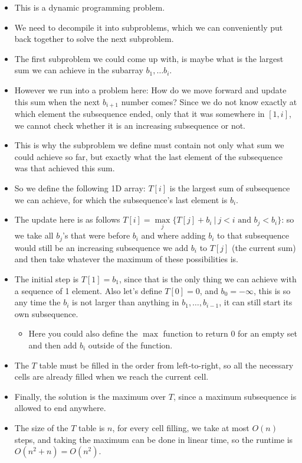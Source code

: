 \begin{itemize}
    \item This is a dynamic programming problem.
    \item We need to decompile it into subproblems, which we can conveniently put back together to solve the next subproblem.
    \item The first subproblem we could come up with, is maybe what is the largest sum we can achieve in the subarray $b_1, \dots{} b_i$.
    \item However we run into a problem here: How do we move forward and update this sum when the next $b_{i+1}$ number comes? Since we do not know exactly at which element the subsequence ended, only that it was somewhere in $[1,i]$, we cannot check whether it is an increasing subsequence or not.
    \item This is why the subproblem we define must contain not only what sum we could achieve so far, but exactly what the last element of the subsequence was that achieved this sum.
    \item So we define the following 1D array: $T[i]$ is the largest sum of subsequence we can achieve, for which the subsequence's last element is $b_i$.
    \item The update here is as follows $T[i] = \max\limits_{j}\{T[j]+b_i ~|~ j < i \text{ and } b_j < b_i \}$: so we take all $b_j$'s that were before $b_i$ and where adding $b_i$ to that subsequence would still be an increasing subsequence we add $b_i$ to $T[j]$ (the current sum) and then take whatever the maximum of these possibilities is.
    \item The initial step is $T[1] = b_1$, since that is the only thing we can achieve with a sequence of 1 element. Also let's define $T[0] = 0$, and $b_0 = -\infty{}$, this is so any time the $b_i$ is not larger than anything in $b_1,\dots{},b_{i-1}$, it can still start its own subsequence.
    \begin{itemize}
        \item Here you could also define the $\max$ function to return $0$ for an empty set and then add $b_i$ outside of the function.
    \end{itemize}
    \item The $T$ table must be filled in the order from left-to-right, so all the necessary cells are already filled when we reach the current cell.
    \item Finally, the solution is the maximum over $T$, since a maximum subsequence is allowed to end anywhere.
    \item The size of the $T$ table is $n$, for every cell filling, we take at most $O(n)$ steps, and taking the maximum can be done in linear time, so the runtime is $O(n^2+n) = O(n^2)$.
\end{itemize}